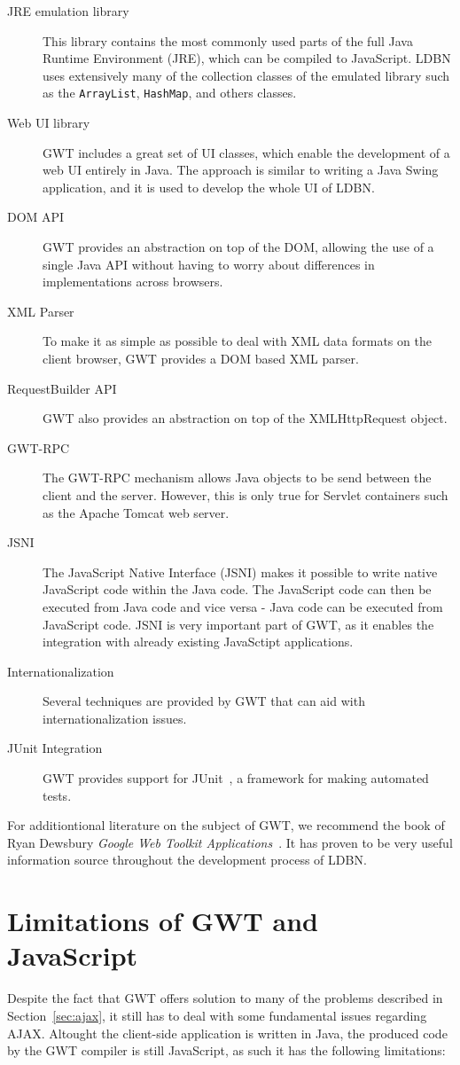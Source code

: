 \begin{description}
	\item[JRE emulation library] This library contains 
	the most commonly used parts of the full Java Runtime Environment (JRE), 
	which can be compiled to JavaScript. LDBN uses extensively many of the collection 
	classes of the emulated library such as the \verb=ArrayList=, \verb=HashMap=, 
	and others classes.
	\item[Web UI library] GWT includes a great set of UI classes, which 
	enable the development of a web UI entirely in Java. The approach is similar 
	to writing a Java Swing application, and it is used to develop the whole UI 
	of LDBN. 
	\item[DOM API] GWT provides an abstraction on top of the DOM, 
	allowing the use of a single Java API without having to worry about 
	differences in implementations across browsers.
	\item[XML Parser] To make it as simple as possible to deal with XML data formats 
	on the client browser, GWT provides a DOM based XML parser.
	\item[RequestBuilder API] GWT also provides an abstraction on top of the
	XMLHttpRequest object. 
	\item[GWT-RPC] The GWT-RPC mechanism allows Java objects to be send between 
	the client and the server. However, this is only true for 
	Servlet containers such as the Apache Tomcat web server. 
	\item[JSNI] The JavaScript Native Interface (JSNI) makes it possible to
	write native JavaScript code within the Java code. The JavaScript code can 
	then be executed from Java code and vice versa - Java code can be executed
	from JavaScript code. JSNI is very important part of GWT, as it enables 
	the integration with already existing JavaSctipt applications.  
	\item[Internationalization] Several techniques are provided by GWT that can 
	aid with internationalization issues.
	\item[JUnit Integration] GWT provides support for JUnit~\cite{wjunit}, 
	a framework for making automated tests.
\end{description}

For additiontional literature on the subject of GWT, we recommend the book of 
Ryan Dewsbury \textit{Google Web Toolkit Applications}~\cite{bgwt2}. It has
proven to be very useful information source throughout the development process 
of LDBN.  

\section{Limitations of GWT and JavaScript}
Despite the fact that GWT offers solution to many of the problems
described in Section~\ref{sec:ajax}, it still has to deal with some 
fundamental issues regarding 
AJAX. Altought the client-side application is written in Java, 
the produced code by the GWT compiler is still JavaScript, 
as such it has the following limitations:
   

